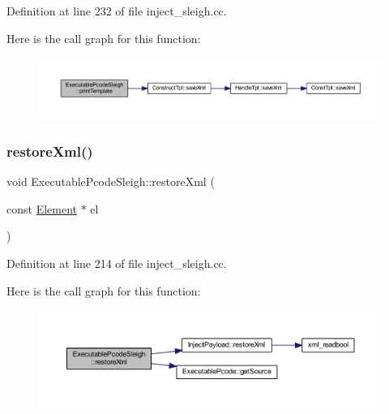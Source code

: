 Definition at line 232 of file inject\+\_\+sleigh.\+cc.

Here is the call graph for this function\+:
\nopagebreak
\begin{figure}[H]
\begin{center}
\leavevmode
\includegraphics[width=350pt]{class_executable_pcode_sleigh_aff5af659202741955010a5302bd08dcd_cgraph}
\end{center}
\end{figure}
\mbox{\label{class_executable_pcode_sleigh_a066df419c0549f9279712783e6ceaa72}} 
\subsubsection{\texorpdfstring{restoreXml()}{restoreXml()}}
{\footnotesize\ttfamily void Executable\+Pcode\+Sleigh\+::restore\+Xml (\begin{DoxyParamCaption}\item[{const \mbox{\hyperlink{class_element}{Element}} $\ast$}]{el }\end{DoxyParamCaption})\hspace{0.3cm}{\ttfamily [virtual]}}



Definition at line 214 of file inject\+\_\+sleigh.\+cc.

Here is the call graph for this function\+:
\nopagebreak
\begin{figure}[H]
\begin{center}
\leavevmode
\includegraphics[width=350pt]{class_executable_pcode_sleigh_a066df419c0549f9279712783e6ceaa72_cgraph}
\end{center}
\end{figure}


